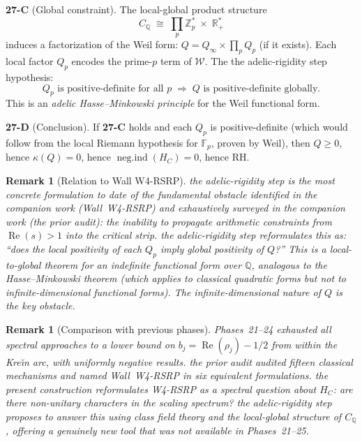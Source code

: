 \documentclass[11pt]{amsart}
\newtheorem{remark}[theorem]{Remark}
\renewcommand{\Re}{\operatorname{Re}}
\newcommand{\kap}{\kappa}
\newcommand{\negind}{\operatorname{neg.ind}}
\newcommand{\CQ}{C_{\mathbb{Q}}}
\newcommand{\Wcal}{\mathcal{W}}
\begin{document}
\medskip
\textbf{27-C} (Global constraint).  The local-global product structure
\[
  \CQ \;\cong\; \prod_p \mathbb{Z}_p^* \;\times\; \mathbb{R}^*_+
\]
induces a factorization of the Weil form: $Q = Q_\infty \times \prod_p Q_p$ (if it exists).
Each local factor $Q_p$ encodes the prime-$p$ term of $\Wcal$.  The the adelic-rigidity step hypothesis:
\[
  Q_p \text{ is positive-definite for all } p
  \;\Longrightarrow\;
  Q \text{ is positive-definite globally.}
\]
This is an \emph{adelic Hasse--Minkowski principle} for the Weil functional form.

\medskip
\textbf{27-D} (Conclusion).  If \textbf{27-C} holds and each $Q_p$ is positive-definite
(which would follow from the local Riemann hypothesis for $\mathbb{F}_p$, proven by Weil),
then $Q \ge 0$, hence $\kap(Q) = 0$, hence $\negind(H_C) = 0$, hence RH.

\begin{remark}[Relation to Wall W4-RSRP]
the adelic-rigidity step is the most concrete formulation to date of the fundamental obstacle identified
in the companion work (Wall~W4-RSRP) and exhaustively surveyed in the companion work (the prior audit):
the inability to propagate arithmetic constraints from $\Re(s) > 1$ into the critical strip.
the adelic-rigidity step reformulates this as: ``does the local positivity of each $Q_p$ imply global
positivity of $Q$?''  This is a local-to-global theorem for an indefinite functional form
over $\mathbb{Q}$, analogous to the Hasse--Minkowski theorem (which applies to classical
quadratic forms but not to infinite-dimensional functional forms).  The infinite-dimensional
nature of $Q$ is the key obstacle.
\end{remark}

\begin{remark}[Comparison with previous phases]
Phases~21--24 exhausted all spectral approaches to a lower bound on $b_j = \Re(\rho_j) - 1/2$
from within the Kre\u{\i}n arc, with uniformly negative results.  the prior audit audited
fifteen classical mechanisms and named Wall~W4-RSRP in six equivalent formulations.
the present construction reformulates W4-RSRP as a spectral question about $H_C$: are there
non-unitary characters in the scaling spectrum?  the adelic-rigidity step proposes to answer this using
class field theory and the local-global structure of $\CQ$, offering a genuinely new tool
that was not available in Phases~21--25.
\end{remark}

\end{document}
